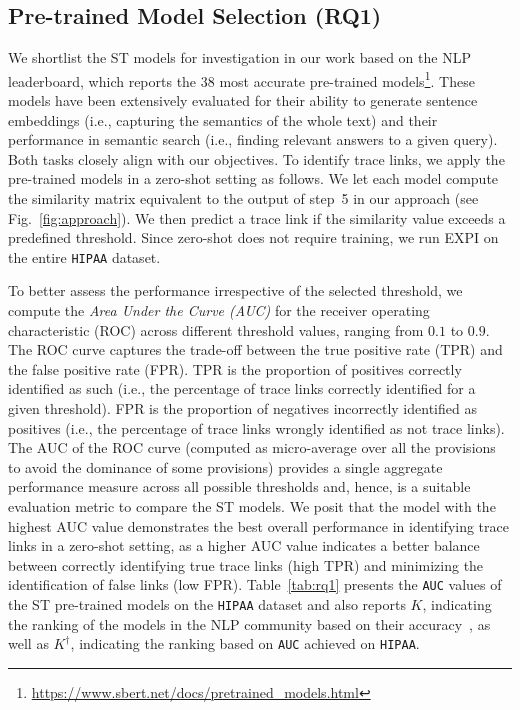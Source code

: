 \subsection{Pre-trained Model Selection (RQ1)} \label{subsec:rq1}

  We shortlist the ST models for investigation in our work based on the NLP  leaderboard, which reports the 38 most accurate pre-trained models\footnote{\url{https://www.sbert.net/docs/pretrained_models.html}}. These models have been extensively evaluated for their ability to generate sentence embeddings (i.e., capturing the semantics of the whole text) and their performance in semantic search (i.e., finding relevant answers to a given query). Both tasks closely align with our objectives. 
To identify trace links, we apply the pre-trained models in a zero-shot setting as follows. 
We let each model compute the similarity matrix equivalent to the output of step~5 in our approach (see Fig.~\ref{fig:approach}). 
We then predict a trace link if the similarity value exceeds 
a predefined threshold. Since zero-shot does not require training, we run EXPI on the entire \texttt{HIPAA} dataset. 


 To better assess the performance irrespective of the selected threshold, we compute the \textit{Area Under the Curve (AUC)} for the receiver operating characteristic (ROC) across different threshold values,  ranging from $0.1$ to $0.9$. 
The ROC curve captures the trade-off between the true positive rate (TPR) and the false positive rate (FPR). TPR is the proportion of positives correctly identified as such (i.e., the percentage of trace links correctly identified for a given threshold). FPR is the proportion of negatives incorrectly identified as positives (i.e., the percentage of trace links wrongly identified as not trace links). The AUC of the ROC curve (computed as micro-average over all the provisions to avoid the dominance of some provisions)  provides a single aggregate performance measure across all possible thresholds and, hence, is a suitable evaluation metric to compare the ST models.  We posit that the model with the highest AUC value demonstrates the best overall performance in identifying trace links in a zero-shot setting, as a higher AUC value indicates a better balance between correctly identifying true trace links (high TPR) and minimizing the identification of false links (low FPR). 
%
%
Table~\ref{tab:rq1} presents the \texttt{AUC} values of the ST pre-trained models on the \texttt{HIPAA} dataset and also  reports $K$, indicating the ranking of the models in the NLP community based on their accuracy~\cite{Reimers:19}, as well as $K^\dag$, indicating the ranking based on \texttt{AUC} achieved on \texttt{HIPAA}. 

